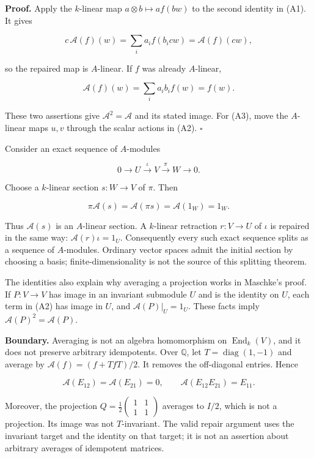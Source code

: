 \documentclass[
  11pt,
]{article}
\begin{document}
\textbf{Proof.} Apply the \(k\)-linear map \(a\otimes b\mapsto a f(bw)\)
to the second identity in (A1). It gives

\[
c\,\mathcal A(f)(w)=\sum_i a_i f(b_i c w)
                  =\mathcal A(f)(cw),
\]

so the repaired map is \(A\)-linear. If \(f\) was already \(A\)-linear,

\[
\mathcal A(f)(w)=\sum_i a_i b_i f(w)=f(w).
\]

These two assertions give \(\mathcal A^2=\mathcal A\) and its stated
image. For (A3), move the \(A\)-linear maps \(u,v\) through the scalar
actions in (A2). \(\square\)

Consider an exact sequence of \(A\)-modules

\[
0\longrightarrow U\xrightarrow{\iota}V
 \xrightarrow{\pi}W\longrightarrow0.
\]

Choose a \(k\)-linear section \(s:W\to V\) of \(\pi\). Then

\[
\pi\mathcal A(s)=\mathcal A(\pi s)
               =\mathcal A(1_W)=1_W.
\]

Thus \(\mathcal A(s)\) is an \(A\)-linear section. A \(k\)-linear
retraction \(r:V\to U\) of \(\iota\) is repaired in the same way:
\(\mathcal A(r)\iota=1_U\). Consequently every such exact sequence
splits as a sequence of \(A\)-modules. Ordinary vector spaces admit the
initial section by choosing a basis; finite-dimensionality is not the
source of this splitting theorem.

The identities also explain why averaging a projection works in
Maschke's proof. If \(P:V\to V\) has image in an invariant submodule
\(U\) and is the identity on \(U\), each term in (A2) has image in
\(U\), and \(\mathcal A(P)|_U=1_U\). These facts imply
\(\mathcal A(P)^2=\mathcal A(P)\).

\textbf{Boundary.} Averaging is not an algebra homomorphism on
\(\operatorname{End}_k(V)\), and it does not preserve arbitrary
idempotents. Over \(\mathbb Q\), let \(T=\operatorname{diag}(1,-1)\) and
average by \(\mathcal A(f)=(f+TfT)/2\). It removes the off-diagonal
entries. Hence

\[
\mathcal A(E_{12})=\mathcal A(E_{21})=0,\qquad
\mathcal A(E_{12}E_{21})=E_{11}.
\]

Moreover, the projection
\(Q=\frac12\begin{pmatrix}1&1\\1&1\end{pmatrix}\) averages to \(I/2\),
which is not a projection. Its image was not \(T\)-invariant. The valid
repair argument uses the invariant target and the identity on that
target; it is not an assertion about arbitrary averages of idempotent
matrices.
\end{document}
